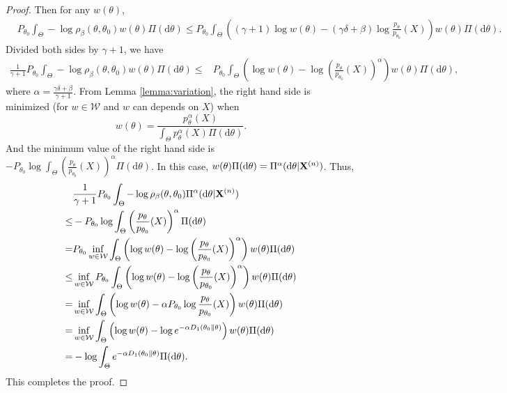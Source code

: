 \documentclass[11pt]{article}
\theoremstyle{plain}
\theoremstyle{definition}
\theoremstyle{remark}
\begin{document}
\begin{proof}
    Then for any $w(\theta)$,
    \begin{align*}
        &
        P_{\theta_0}\int_{\Theta}  - \log \rho_\beta (\theta, \theta_0)  w(\theta) \Pi(\mathrm d \theta) 
        \leq 
        P_{\theta_0}
        \int_{\Theta} \left( (\gamma + 1) \log w(\theta) - (  \gamma\delta + \beta  ) \log \frac{p_\theta}{p_{\theta_0}}(X)  \right) w(\theta) \Pi(\mathrm d \theta) 
        .
    \end{align*}
    Divided both sides by $\gamma+1$, we have
    \begin{align*}
        \frac{1}{\gamma+1}P_{\theta_0}\int_{\Theta}  - \log \rho_\beta (\theta, \theta_0)  w(\theta) \Pi(\mathrm d \theta) 
        \leq  &
        P_{\theta_0}
        \int_{\Theta} \left(  \log w(\theta) -  \log\left( \frac{p_\theta}{p_{\theta_0}}(X) \right)^\alpha   \right) w(\theta) \Pi(\mathrm d \theta) 
        ,
    \end{align*}
    where $\alpha = \frac{\gamma \delta + \beta}{\gamma+1}$.
    From Lemma \ref{lemma:variation}, the right hand side is minimized (for $w\in \mathcal W$ and $w$ can depends on $X$) when
    \begin{equation*}
        w(\theta) = \frac{\displaystyle p_{\theta}^{\alpha} (X) }{
\displaystyle
            \int_{\Theta} 
            p_{\theta}^{\alpha } (X) 
            \Pi(\mathrm d \theta)
        }.
    \end{equation*}
    And the minimum value of the right hand side is $-P_{\theta_0} \log \int_{\Theta} \left( \frac{p_{\theta}}{p_{\theta_0}}(X) \right)^\alpha \Pi(\mathrm d \theta)$.
    In this case, $w(\theta) \Pi(\mathrm d \theta) = \Pi^{\alpha}( \mathrm d \theta | \mathbf{X}^{(n)}) $.
    Thus,
    \begin{align*}
        &\frac{1}{\gamma+1} P_{\theta_0} \int_{\Theta} - \log \rho_\beta(\theta, \theta_0) \Pi^\alpha (\mathrm d \theta | \mathbf{X}^{(n)})
        \\
        \leq &
-P_{\theta_0} \log \int_{\Theta} \left( \frac{p_{\theta}}{p_{\theta_0}}(X) \right)^\alpha \Pi(\mathrm d \theta)
\\
= &
        P_{\theta_0}
        \inf_{w\in \mathcal W}
        \int_{\Theta} \left(  \log w(\theta) -  \log\left( \frac{p_\theta}{p_{\theta_0}}(X) \right)^\alpha   \right) w(\theta) \Pi(\mathrm d \theta) 
\\
\leq &
\inf_{w\in \mathcal W}
        P_{\theta_0}
        \int_{\Theta} \left(  \log w(\theta) -  \log\left( \frac{p_\theta}{p_{\theta_0}}(X) \right)^\alpha   \right) w(\theta) \Pi(\mathrm d \theta) 
\\
= &
\inf_{w\in \mathcal W}
        \int_{\Theta} \left(  \log w(\theta) - \alpha P_{\theta_0}\log \frac{p_\theta}{p_{\theta_0}}(X)  \right) w(\theta) \Pi(\mathrm d \theta) 
\\
= &
\inf_{w\in \mathcal W}
\int_{\Theta} \left(  \log w(\theta) -\log e^{- \alpha D_1(\theta_0\| \theta)}   \right) w(\theta) \Pi(\mathrm d \theta) 
\\
= &
-\log \int_{\Theta}  e^{- \alpha D_1(\theta_0\| \theta)} \Pi(\mathrm d \theta) .
    \end{align*}
    This completes the proof.
    
\end{proof}
\end{document}
